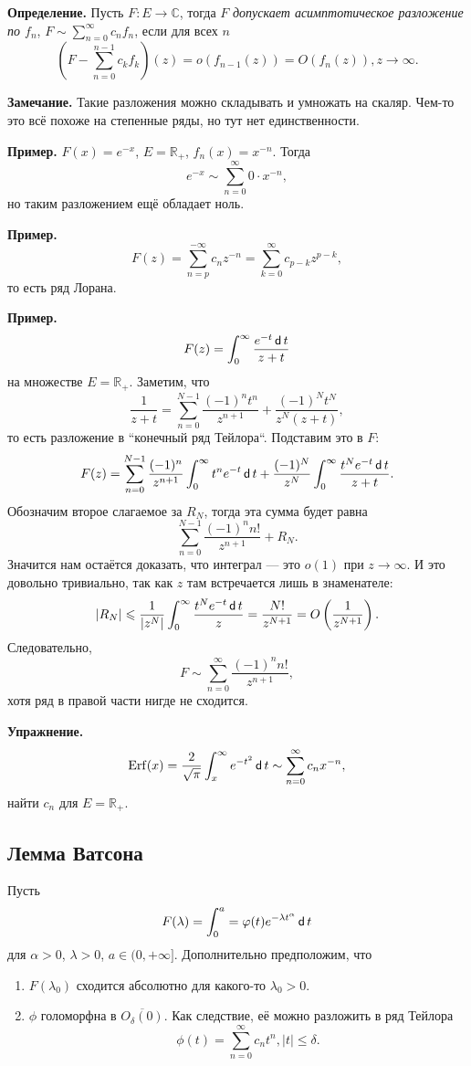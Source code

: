 \textbf{Определение.} Пусть $F: E \to \mathbb C$, тогда $F$ \textit{допускает асимптотическое разложение по $f_n$}, $F \sim \sum_{n=0}^{\infty} c_n f_n$, если для всех $n$
\[
    \left( F - \sum_{n=0}^{n - 1}  c_k f_k \right)(z) = o(f_{n-1}(z)) = O(f_n(z)), z \to \infty.
\]

\textbf{Замечание.} Такие разложения можно складывать и умножать на скаляр.
Чем-то это всё похоже на степенные ряды, но тут нет единственности.

\textbf{Пример.} $F(x) = e^{-x}$, $E = \mathbb R_+$, $f_n(x) = x^{-n}$.
Тогда
\[
    e^{-x} \sim \sum_{n=0}^{\infty} 0 \cdot x^{-n},
\]
но таким разложением ещё обладает ноль.

\textbf{Пример.} 
\[
    F(z) = \sum_{n=p}^{-\infty} c_n z^{-n} = \sum_{k=0}^{\infty} c_{p-k} z^{p-k},
\]
то есть ряд Лорана.

\textbf{Пример.}
\[
    F(z) = \int_0^\infty \frac{e^{-t} \operatorname{\mathsf d} t}{z + t}
\]
на множестве $E = \mathbb R_+$.
Заметим, что
\[
    \frac{1}{z + t} = \sum_{n=0}^{N - 1} \frac{(-1)^n t^n}{z^{n+1}} + \frac{(-1)^N t^N}{z^N (z + t)},
\]
то есть разложение в ``конечный ряд Тейлора``.
Подставим это в $F$:
\[
    F(z) = \sum_{n=0}^{N-1} \frac{(-1)^n}{z^{n+1}} \int_0^\infty t^n e^{-t} \operatorname{\mathsf d} t + \frac{(-1)^N}{z^N} \int_0^\infty \frac{t^N e^{-t} \operatorname{\mathsf d} t}{z + t}.
\]
Обозначим второе слагаемое за $R_N$, тогда эта сумма будет равна
\[
    \sum_{n=0}^{N-1} \frac{(-1)^n n!}{z^{n+1}} + R_N.
\]
Значится нам остаётся доказать, что интеграл --- это $o(1)$ при $z \to \infty$.
И это довольно тривиально, так как $z$ там встречается лишь в знаменателе:
\[
    |R_N| \leqslant \frac{1}{|z^N|} \int_0^\infty \frac{t^N e^{-t} \operatorname{\mathsf d} t}{z} = \frac{N!}{z^{N+1}} = O \left( \frac{1}{z^{N+1}} \right).
\]
Следовательно,
\[
    F \sim \sum_{n=0}^{\infty} \frac{(-1)^n n!}{z^{n+1}},
\]
хотя ряд в правой части нигде не сходится.

\textbf{Упражнение.}
\[
    \operatorname{Erf}(x) = \frac{2}{\sqrt \pi} \int_x^\infty e^{-t^2} \operatorname{\mathsf d} t \sim \sum_{n=0}^{\infty} c_n x^{-n},
\]
найти $c_n$ для $E = \mathbb R_+$.

\subsection{Лемма Ватсона}
Пусть
\[
    F(\lambda) = \int_0^a = \varphi(t) e^{-\lambda t^\alpha} \operatorname{\mathsf d} t
\]
для $\alpha > 0$, $\lambda > 0$, $a \in (0, +\infty]$.
Дополнительно предположим, что
\begin{enumerate}
    \item $F(\lambda_0)$ сходится абсолютно для какого-то $\lambda_0 > 0$.
    \item $\phi$ голоморфна в $\overline {O_\delta(0)}$.
        Как следствие, её можно разложить в ряд Тейлора
        \[
            \phi(t) = \sum_{n=0}^{\infty} c_n t^n, |t| \le \delta.
        \]
\end{enumerate}

